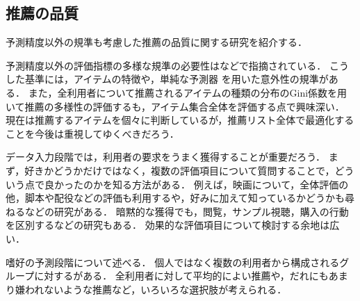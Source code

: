 \subsection{推薦の品質}
\label{sec:openproblem:quality}

予測精度以外の規準も考慮した推薦の品質\cite{sigchi:06:01}に関する研究を紹介する．

予測精度以外の評価指標の多様な規準の必要性は\cite{sigchi:06:02}などで指摘されている．
こうした基準には，アイテムの特徴\cite{www:05:01}や，単純な予測器\cite{trjsai:07:03} を用いた意外性の規準がある．
また，全利用者について推薦されるアイテムの種類の分布のGini係数を用いて推薦の多様性の評価する\cite{ec:030}も，アイテム集合全体を評価する点で興味深い．
現在は推薦するアイテムを個々に判断しているが，推薦リスト全体で最適化することを今後は重視してゆくべきだろう\cite{sigchi:06:01}．

データ入力段階では，利用者の要求をうまく獲得することが重要だろう．
まず，好きかどうかだけではなく，複数の評価項目について質問することで，どういう点で良かったのかを知る方法がある．
例えば，映画について，全体評価の他，脚本や配役などの評価も利用する\cite{ieeem:07:02}や，好みに加えて知っているかどうかも尋ねる\cite{trieice:07:03}などの研究がある．
暗黙的な獲得でも，閲覧，サンプル視聴，購入の行動を区別する\cite{ieeem:07:01}などの研究もある．
効果的な評価項目について検討する余地は広い．

嗜好の予測段階について述べる．
個人ではなく複数の利用者から構成されるグループに対するがある\cite{ec:032,jc:011,misc:014,misc:015,misc:016}．
全利用者に対して平均的によい推薦や，だれにもあまり嫌われないような推薦など，いろいろな選択肢が考えられる．
